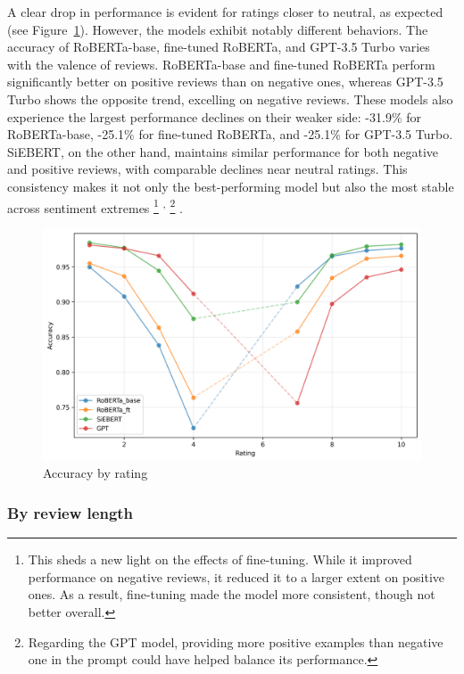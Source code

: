\documentclass{article}
\begin{document}
A clear drop in performance is evident for ratings closer to neutral, as expected (see Figure~\ref{fig:accuracy-ratings}). However, the models exhibit notably different behaviors. The accuracy of RoBERTa-base, fine-tuned RoBERTa, and GPT-3.5 Turbo varies with the valence of reviews. RoBERTa-base and fine-tuned RoBERTa perform significantly better on positive reviews than on negative ones, whereas GPT-3.5 Turbo shows the opposite trend, excelling on negative reviews. These models also experience the largest performance declines on their weaker side: -31.9\% for RoBERTa-base, -25.1\% for fine-tuned RoBERTa, and -25.1\% for GPT-3.5 Turbo. SiEBERT, on the other hand, maintains similar performance for both negative and positive reviews, with comparable declines near neutral ratings. This consistency makes it not only the best-performing model but also the most stable across sentiment extremes 
\footnote{This sheds a new light on the effects of fine-tuning. While it improved performance on negative reviews, it reduced it to a larger extent on positive ones. As a result, fine-tuning made the model more consistent, though not better overall.}
\textsuperscript{,}
\footnote{Regarding the GPT model, providing more positive examples than negative one in the prompt could have helped balance its performance.}
.

\begin{figure}
  \centering
  \includegraphics[width=\textwidth]{figures/accuracy_vs_ratings.png}
  \caption{Accuracy by rating}
  \label{fig:accuracy-ratings}
\end{figure}

\subsubsection{By review length}
\end{document}
